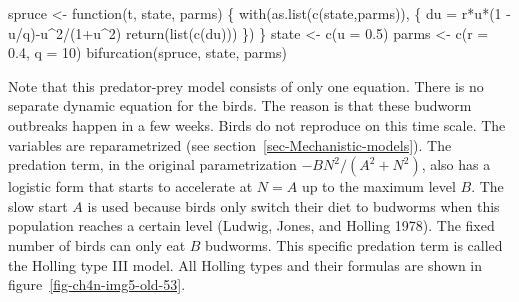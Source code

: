 \documentclass[
  a4paper,
  DIV=11,
  numbers=noendperiod,
  oneside]{scrreprt}
\newenvironment{Shaded}{}{}
\newcommand{\AttributeTok}[1]{\textcolor[rgb]{0.84,0.23,0.29}{#1}}
\newcommand{\ControlFlowTok}[1]{\textcolor[rgb]{0.84,0.23,0.29}{#1}}
\newcommand{\DecValTok}[1]{\textcolor[rgb]{0.00,0.36,0.77}{#1}}
\newcommand{\FloatTok}[1]{\textcolor[rgb]{0.00,0.36,0.77}{#1}}
\newcommand{\FunctionTok}[1]{\textcolor[rgb]{0.44,0.26,0.76}{#1}}
\newcommand{\NormalTok}[1]{\textcolor[rgb]{0.14,0.16,0.18}{#1}}
\newcommand{\OtherTok}[1]{\textcolor[rgb]{0.44,0.26,0.76}{#1}}
\newcommand{\SpecialCharTok}[1]{\textcolor[rgb]{0.00,0.36,0.77}{#1}}
\begin{document}
\begin{Shaded}
\begin{Highlighting}[]
\NormalTok{spruce }\OtherTok{\textless{}{-}} \ControlFlowTok{function}\NormalTok{(t, state, parms) \{}
  \FunctionTok{with}\NormalTok{(}\FunctionTok{as.list}\NormalTok{(}\FunctionTok{c}\NormalTok{(state,parms)), \{}
\NormalTok{    du }\OtherTok{=}\NormalTok{ r}\SpecialCharTok{*}\NormalTok{u}\SpecialCharTok{*}\NormalTok{(}\DecValTok{1} \SpecialCharTok{{-}}\NormalTok{ u}\SpecialCharTok{/}\NormalTok{q)}\SpecialCharTok{{-}}\NormalTok{u}\SpecialCharTok{\^{}}\DecValTok{2}\SpecialCharTok{/}\NormalTok{(}\DecValTok{1}\SpecialCharTok{+}\NormalTok{u}\SpecialCharTok{\^{}}\DecValTok{2}\NormalTok{)}
    \FunctionTok{return}\NormalTok{(}\FunctionTok{list}\NormalTok{(}\FunctionTok{c}\NormalTok{(du)))}
\NormalTok{  \})}
\NormalTok{\}}
\NormalTok{state }\OtherTok{\textless{}{-}} \FunctionTok{c}\NormalTok{(}\AttributeTok{u =} \FloatTok{0.5}\NormalTok{)}
\NormalTok{parms }\OtherTok{\textless{}{-}} \FunctionTok{c}\NormalTok{(}\AttributeTok{r =} \FloatTok{0.4}\NormalTok{, }\AttributeTok{q =} \DecValTok{10}\NormalTok{)}
\FunctionTok{bifurcation}\NormalTok{(spruce, state, parms)}
\end{Highlighting}
\end{Shaded}

Note that this predator-prey model consists of only one equation. There
is no separate dynamic equation for the birds. The reason is that these
budworm outbreaks happen in a few weeks. Birds do not reproduce on this
time scale. The variables are reparametrized (see
section~\ref{sec-Mechanistic-models}). The predation term, in the
original parametrization \(- BN^{2}/(A^{2} + N^{2})\), also has a
logistic form that starts to accelerate at \(N = A\) up to the maximum
level \(B\). The slow start \(A\) is used because birds only switch
their diet to budworms when this population reaches a certain level
(Ludwig, Jones, and Holling 1978). The fixed number of birds can only
eat \(B\) budworms. This specific predation term is called the Holling
type III model. All Holling types and their formulas are shown in
figure~\ref{fig-ch4n-img5-old-53}.
\end{document}
